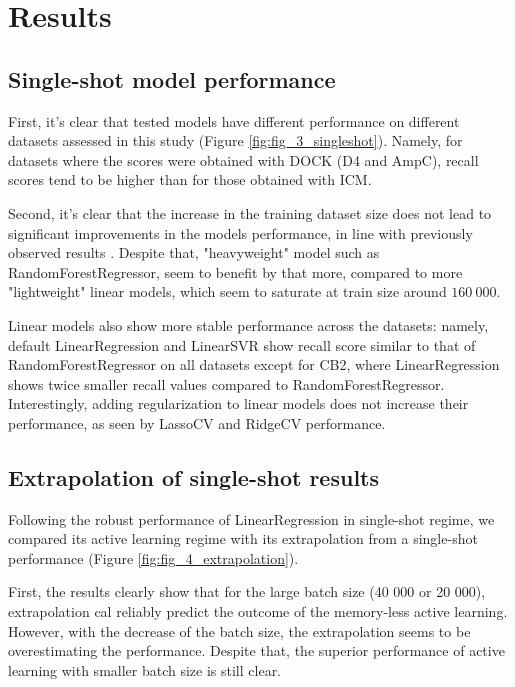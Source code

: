 \section{Results}

\subsection{Single-shot model performance}
\label{subsection:single-shot}

First, it's clear that tested models have different performance on different datasets assessed in this study (Figure \ref{fig:fig_3_singleshot}). Namely, for datasets where the scores were obtained with DOCK (D4 and AmpC), recall scores tend to be higher than for those obtained with ICM.

Second, it's clear that the increase in the training dataset size does not lead to significant improvements in the models performance, in line with previously observed results \cite{Yang2021_shoichet_active_learning}. Despite that, "heavyweight" model such as RandomForestRegressor, seem to benefit by that more, compared to more "lightweight" linear models, which seem to saturate at train size around $160\ 000$.

Linear models also show more stable performance across the datasets: namely, default LinearRegression and LinearSVR show recall score similar to that of RandomForestRegressor on all datasets except for CB2, where LinearRegression shows twice smaller recall values compared to RandomForestRegressor. Interestingly, adding regularization to linear models does not increase their performance, as seen by LassoCV and RidgeCV performance.

\subsection{Extrapolation of single-shot results}
Following the robust performance of LinearRegression in single-shot regime, we compared its active learning regime with its extrapolation from a single-shot performance (Figure \ref{fig:fig_4_extrapolation}). 

First, the results clearly show that for the large batch size (40 000 or 20 000), extrapolation cal reliably predict the outcome of the memory-less active learning. However, with the decrease of the batch size, the extrapolation seems to be overestimating the performance. Despite that, the superior performance of active learning with smaller batch size is still clear.

